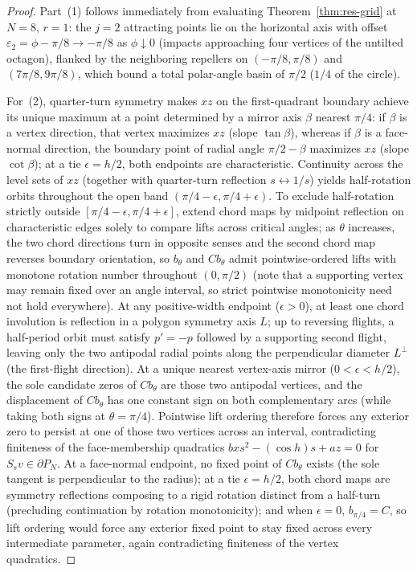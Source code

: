 \documentclass[11pt,reqno]{amsart}
\theoremstyle{definition}
\theoremstyle{remark}
\begin{document}
\begin{proof}
Part~(1) follows immediately from evaluating Theorem~\ref{thm:res-grid} at $N = 8$, $r = 1$: the $j = 2$ attracting points lie on the horizontal axis with offset $\varepsilon_2 = \phi - \pi/8 \to -\pi/8$ as $\phi \downarrow 0$ (impacts approaching four vertices of the untilted octagon), flanked by the neighboring repellers on $(-\pi/8, \pi/8)$ and $(7\pi/8, 9\pi/8)$, which bound a total polar-angle basin of $\pi/2$ ($1/4$ of the circle).

For~(2), quarter-turn symmetry makes $xz$ on the first-quadrant boundary achieve its unique maximum at a point determined by a mirror axis $\beta$ nearest $\pi/4$: if $\beta$ is a vertex direction, that vertex maximizes $xz$ (slope $\tan\beta$), whereas if $\beta$ is a face-normal direction, the boundary point of radial angle $\pi/2 - \beta$ maximizes $xz$ (slope $\cot\beta$); at a tie $\epsilon = h/2$, both endpoints are characteristic. Continuity across the level sets of $xz$ (together with quarter-turn reflection $s \leftrightarrow 1/s$) yields half-rotation orbits throughout the open band $(\pi/4 - \epsilon, \pi/4 + \epsilon)$. To exclude half-rotation strictly outside $[\pi/4 - \epsilon, \pi/4 + \epsilon]$, extend chord maps by midpoint reflection on characteristic edges solely to compare lifts across critical angles; as $\theta$ increases, the two chord directions turn in opposite senses and the second chord map reverses boundary orientation, so $b_\theta$ and $Cb_\theta$ admit pointwise-ordered lifts with monotone rotation number throughout $(0, \pi/2)$ (note that a supporting vertex may remain fixed over an angle interval, so strict pointwise monotonicity need not hold everywhere). At any positive-width endpoint ($\epsilon > 0$), at least one chord involution is reflection in a polygon symmetry axis $L$; up to reversing flights, a half-period orbit must satisfy $p' = -p$ followed by a supporting second flight, leaving only the two antipodal radial points along the perpendicular diameter $L^\perp$ (the first-flight direction). At a unique nearest vertex-axis mirror ($0 < \epsilon < h/2$), the sole candidate zeros of $Cb_\theta$ are those two antipodal vertices, and the displacement of $Cb_\theta$ has one constant sign on both complementary arcs (while taking both signs at $\theta = \pi/4$). Pointwise lift ordering therefore forces any exterior zero to persist at one of those two vertices across an interval, contradicting finiteness of the face-membership quadratics $bxs^2 - (\cos h)s + az = 0$ for $S_s v \in \partial P_N$. At a face-normal endpoint, no fixed point of $Cb_\theta$ exists (the sole tangent is perpendicular to the radius); at a tie $\epsilon = h/2$, both chord maps are symmetry reflections composing to a rigid rotation distinct from a half-turn (precluding continuation by rotation monotonicity); and when $\epsilon = 0$, $b_{\pi/4} = C$, so lift ordering would force any exterior fixed point to stay fixed across every intermediate parameter, again contradicting finiteness of the vertex quadratics.
\end{proof}
\end{document}
